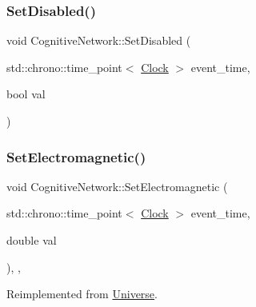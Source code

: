 \subsubsection{\texorpdfstring{Set\+Disabled()}{SetDisabled()}}
{\footnotesize\ttfamily void Cognitive\+Network\+::\+Set\+Disabled (\begin{DoxyParamCaption}\item[{std\+::chrono\+::time\+\_\+point$<$ \mbox{\hyperlink{universe_8h_a0ef8d951d1ca5ab3cfaf7ab4c7a6fd80}{Clock}} $>$}]{event\+\_\+time,  }\item[{bool}]{val }\end{DoxyParamCaption})\hspace{0.3cm}{\ttfamily [inline]}}

\mbox{\label{classCognitiveNetwork_a31764cd5746369d16b45f2ff74806a0b}} 
\subsubsection{\texorpdfstring{Set\+Electromagnetic()}{SetElectromagnetic()}}
{\footnotesize\ttfamily void Cognitive\+Network\+::\+Set\+Electromagnetic (\begin{DoxyParamCaption}\item[{std\+::chrono\+::time\+\_\+point$<$ \mbox{\hyperlink{universe_8h_a0ef8d951d1ca5ab3cfaf7ab4c7a6fd80}{Clock}} $>$}]{event\+\_\+time,  }\item[{double}]{val }\end{DoxyParamCaption})\hspace{0.3cm}{\ttfamily [inline]}, {\ttfamily [final]}, {\ttfamily [virtual]}}



Reimplemented from \mbox{\hyperlink{classUniverse_aa981fc7e252b1fbbb675f0371860954d}{Universe}}.

\mbox{\label{classCognitiveNetwork_a270f6842ec14b3e5b80dedf7b48ea6f4}} 
